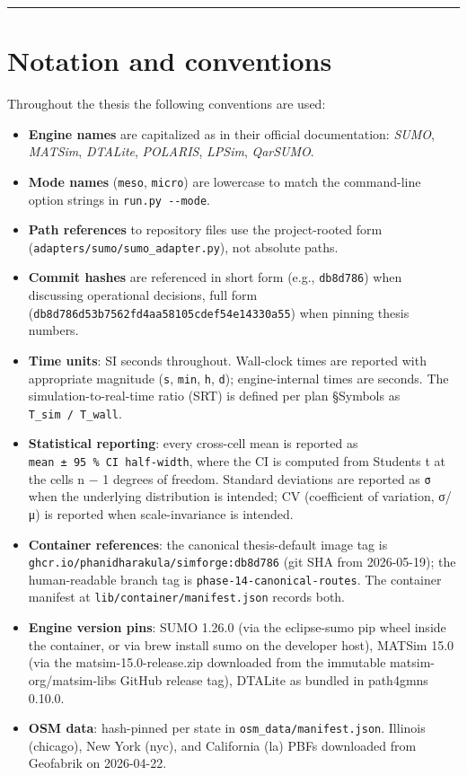 \begin{center}\rule{0.5\linewidth}{0.5pt}\end{center}

\section{Notation and
conventions}\label{17-notation-and-conventions}

Throughout the thesis the following conventions are used:

\begin{itemize}
\tightlist
\item
  \textbf{Engine names} are capitalized as in their official
  documentation: \emph{SUMO}, \emph{MATSim}, \emph{DTALite},
  \emph{POLARIS}, \emph{LPSim}, \emph{QarSUMO}.
\item
  \textbf{Mode names} (\texttt{meso}, \texttt{micro}) are lowercase to
  match the command-line option strings in \texttt{run.py\ -\/-mode}.
\item
  \textbf{Path references} to repository files use the project-rooted
  form (\texttt{adapters/sumo/sumo\_adapter.py}), not absolute paths.
\item
  \textbf{Commit hashes} are referenced in short form (e.g.,
  \texttt{db8d786}) when discussing operational decisions, full form
  (\texttt{db8d786d53b7562fd4aa58105cdef54e14330a55}) when pinning
  thesis numbers.
\item
  \textbf{Time units}: SI seconds throughout. Wall-clock times are
  reported with appropriate magnitude (\texttt{s}, \texttt{min},
  \texttt{h}, \texttt{d}); engine-internal times are seconds. The
  simulation-to-real-time ratio (SRT) is defined per plan §Symbols
  as \texttt{T\_sim\ /\ T\_wall}.
\item
  \textbf{Statistical reporting}: every cross-cell mean is reported as
  \texttt{mean\ ±\ 95\ \%\ CI\ half-width}, where the CI is computed
  from Student\textquotesingle s t at the cell\textquotesingle s n − 1
  degrees of freedom. Standard deviations are reported as \texttt{σ}
  when the underlying distribution is intended; CV (coefficient of
  variation, σ/μ) is reported when scale-invariance is intended.
\item
  \textbf{Container references}: the canonical thesis-default image tag
  is \texttt{ghcr.io/phanidharakula/simforge:db8d786} (git SHA from
  2026-05-19); the human-readable branch tag is
  \texttt{phase-14-canonical-routes}. The container manifest at
  \texttt{lib/container/manifest.json} records both.
\item
  \textbf{Engine version pins}: SUMO 1.26.0 (via the eclipse-sumo pip
  wheel inside the container, or via brew install sumo on the developer
  host), MATSim 15.0 (via the matsim-15.0-release.zip downloaded from
  the immutable matsim-org/matsim-libs GitHub release tag), DTALite as
  bundled in path4gmns 0.10.0.
\item
  \textbf{OSM data}: hash-pinned per state in
  \texttt{osm\_data/manifest.json}. Illinois (chicago), New York (nyc),
  and California (la) PBFs downloaded from Geofabrik on 2026-04-22.
\end{itemize}
